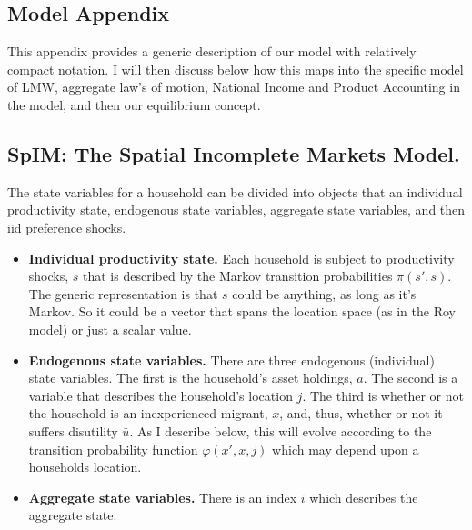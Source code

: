 \documentclass[12pt,pdftex]{article}
\begin{document}
\begin{onehalfspacing}
\newpage

\section{Model Appendix}

This appendix provides a generic description of our model with relatively compact notation. I will then discuss below how this maps into the specific model of LMW, aggregate law's of motion, National Income and Product Accounting in the model, and then our equilibrium concept.

\subsection{SpIM: The Spatial Incomplete Markets Model.}

The state variables for a household can be divided into objects that an individual productivity state, endogenous state variables, aggregate state variables, and then iid preference shocks.
\begin{itemize}
\item \textbf{Individual productivity state.} Each household is subject to productivity shocks, $s$ that is described by the Markov transition probabilities $\pi(s',s)$. The generic representation is that $s$ could be anything, as long as it's Markov. So it could be a vector that spans the location space (as in the Roy model) or just a scalar value.

\item \textbf{Endogenous state variables.} There are three endogenous (individual) state variables. The first is the household's asset holdings, $a$. The second is a variable that describes the household's location $j$. The third is whether or not the household is an inexperienced migrant, $x$, and, thus, whether or not it suffers disutility $\bar u$. As I describe below, this will evolve according to the transition probability function $\varphi(x',x, j)$ which may depend upon a households location.

\item \textbf{Aggregate state variables.} There is an index $i$ which describes the aggregate state. 


\end{itemize}
\end{onehalfspacing}
\end{document}
